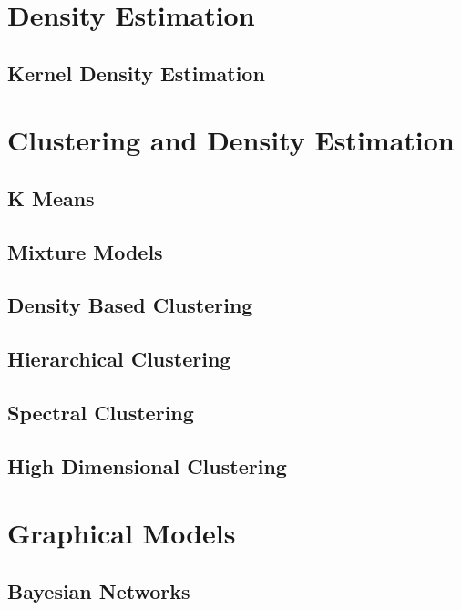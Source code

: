 \documentclass{article}
\begin{document}
\section{Density Estimation}

  \subsection{Kernel Density Estimation} 

\section{Clustering and Density Estimation} 

  \subsection{K Means} 

  \subsection{Mixture Models}

  \subsection{Density Based Clustering}

  \subsection{Hierarchical Clustering} 

  \subsection{Spectral Clustering}

  \subsection{High Dimensional Clustering}

\section{Graphical Models} 

  \subsection{Bayesian Networks} 
\end{document}
